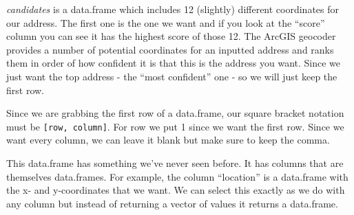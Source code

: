 \documentclass[
  12pt,
]{book}
\newenvironment{Shaded}{\begin{snugshade}}{\end{snugshade}}
\newcommand{\CommentTok}[1]{\textcolor[rgb]{0.37,0.37,0.37}{\textit{#1}}}
\newcommand{\DecValTok}[1]{\textcolor[rgb]{0.06,0.06,0.06}{#1}}
\newcommand{\KeywordTok}[1]{\textcolor[rgb]{0.27,0.27,0.27}{\textbf{#1}}}
\newcommand{\NormalTok}[1]{#1}
\newcommand{\OperatorTok}[1]{\textcolor[rgb]{0.43,0.43,0.43}{\textbf{#1}}}
\newcommand{\StringTok}[1]{\textcolor[rgb]{0.5,0.5,0.5}{#1}}
\begin{document}
\emph{candidates} is a data.frame which includes 12 (slightly) different coordinates for our address. The first one is the one we want and if you look at the ``score'' column you can see it has the highest score of those 12. The ArcGIS geocoder provides a number of potential coordinates for an inputted address and ranks them in order of how confident it is that this is the address you want. Since we just want the top address - the ``most confident'' one - so we will just keep the first row.

Since we are grabbing the first row of a data.frame, our square bracket notation must be \texttt{{[}row,\ column{]}}. For row we put 1 since we want the first row. Since we want every column, we can leave it blank but make sure to keep the comma.

\begin{Shaded}
\end{Shaded}

This data.frame has something we've never seen before. It has columns that are themselves data.frames. For example, the column ``location'' is a data.frame with the x- and y-coordinates that we want. We can select this exactly as we do with any column but instead of returning a vector of values it returns a data.frame.

\begin{Shaded}
\end{Shaded}
\end{document}
